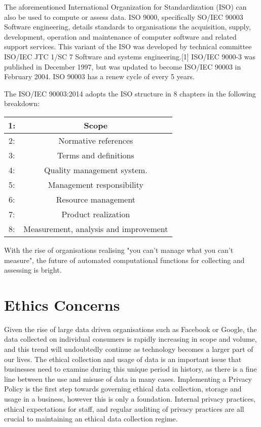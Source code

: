 \documentclass{article}
\begin{document}
The aforementioned International Organization for Standardization (ISO) can also be used to compute or assess data. ISO 9000, specifically SO/IEC 90003 Software engineering, details standards to organisations the acquisition, supply, development, operation and maintenance of computer software and related support services. This variant of the ISO was developed by technical committee ISO/IEC JTC 1/SC 7 Software and systems engineering.[1] ISO/IEC 9000-3 was published in December 1997, but was updated to become ISO/IEC 90003 in February 2004. ISO 90003 has a renew cycle of every 5 years. \cite{iso}

The ISO/IEC 90003:2014 adopts the ISO structure in 8 chapters in the following breakdown:

\begin{center}
\begin{tabular}{||c c||} 
\hline
1: & Scope \\ 
\hline
2: & Normative references \\ 
\hline
3: & Terms and definitions \\
\hline
4: & Quality management system. \\
\hline
5: & Management responsibility \\
\hline
6: & Resource management \\ 
\hline
7: & Product realization \\
\hline
8: & Measurement, analysis and improvement \\
\hline
\end{tabular}
\end{center}

With the rise of organisations realising "you can't manage what you can't measure", the future of automated computational functions for collecting and assessing is bright. 

\section {Ethics Concerns} Given the rise of large data driven organisations such as Facebook or Google, the data collected on individual consumers is rapidly increasing in scope and volume, and this trend will undoubtedly continue as technology becomes a larger part of our lives. The ethical collection and usage of data is an important issue that businesses need to examine during this unique period in history, as there is a fine line between the use and misuse of data in many cases.
Implementing a Privacy Policy is the first step towards governing ethical data collection, storage and usage in a business, however this is only a foundation. Internal privacy practices, ethical expectations for staff, and regular auditing of privacy practices are all crucial to maintaining an ethical data collection regime. \newline
\end{document}
